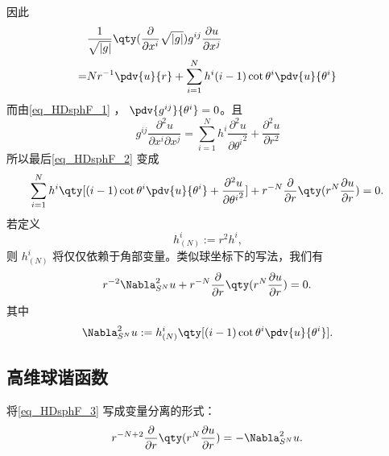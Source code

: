 因此
\begin{equation}
\begin{aligned}
&\frac{1}{\sqrt{ \left\lvert g \right\rvert }} \qty(\frac{\partial }{\partial x^i} \sqrt{ \left\lvert g \right\rvert })g^{ij} \frac{\partial u}{\partial x^j}\\
=&Nr^{-1}\pdv{u}{r}+\sum_{i=1}^{N}h^{i}(i-1)\cot\theta^i\pdv{u}{\theta^i}\\
\end{aligned}~
\end{equation}
而由\autoref{eq_HDsphF_1} ， $\pdv{g^{ij}}{\theta^i}=0$。且
\begin{equation}
g^{ij}\frac{\partial^2 u}{\partial x^i\partial x^j}=\sum_{i=1}^{N}h^{i}\frac{\partial^2 u}{\partial {\theta^i}^2}+\frac{\partial^2 u}{\partial r^2}~
\end{equation}
所以最后\autoref{eq_HDsphF_2} 变成
\begin{equation}
\begin{aligned}
\sum_{i=1}^{N}h^{i}\qty[(i-1)\cot\theta^i\pdv{u}{\theta^i}+\frac{\partial^2 u}{\partial {\theta^i}^2}]+r^{-N}\frac{\partial }{\partial r}\qty(r^{N}\frac{\partial u}{\partial r})=0.
\end{aligned}~
\end{equation}
若定义 
\begin{equation}
h^i_{(N)}:=r^2h^i,~
\end{equation}
则 $h^i_{(N)}$ 将仅仅依赖于角部变量。类似球坐标下的写法，我们有
\begin{equation}\label{eq_HDsphF_3}
r^{-2}\Nabla^{2}_{S^N}u+r^{-N}\frac{\partial }{\partial r}\qty(r^{N}\frac{\partial u}{\partial r})=0.~
\end{equation}
其中
\begin{equation}
\Nabla^{2}_{S^N}u:=h^{i}_{(N)}\qty[(i-1)\cot\theta^i\pdv{u}{\theta^i}].~
\end{equation}

\subsection{高维球谐函数}
将\autoref{eq_HDsphF_3} 写成变量分离的形式：
\begin{equation}
r^{-N+2}\frac{\partial }{\partial r}\qty(r^{N}\frac{\partial u}{\partial r})=-\Nabla^{2}_{S^N}u.~
\end{equation}









